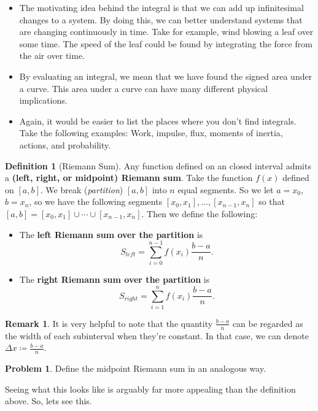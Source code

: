 \documentclass[12pt]{article}
\theoremstyle{definition}
\newtheorem{definition}{Definition}[section]
\newtheorem{remark}{Remark}[section]
\newtheorem{problem}{Problem}[section]
\begin{document}
\begin{itemize}
    \item The motivating idea behind the integral is that we can add up infinitesimal changes to a system. By doing this, we can better understand systems that are changing continuously in time. Take for example, wind blowing a leaf over some time.  The speed of the leaf could be found by integrating the force from the air over time.
    \item By evaluating an integral, we mean that we have found the signed area under a curve.  This area under a curve can have many different physical implications.
    \item Again, it would be easier to list the places where you don't find integrals.  Take the following examples: Work, impulse, flux, moments of inertia, actions, and probability.
\end{itemize}

\begin{definition}[Riemann Sum]
Any function defined on an closed interval admits a \textbf{(left, right, or midpoint) Riemann sum}. Take the function $f(x)$ defined on $[a,b]$. We break (\emph{partition}) $[a,b]$ into $n$ equal segments. So we let $a=x_0$, $b=x_n$, so we have the following segments $[x_0,x_1],\dots,[x_{n-1},x_n]$ so that $[a,b]=[x_0,x_1]\cup \cdots \cup [x_{n-1},x_n]$. Then we define the following:
\begin{itemize}
    \item The \textbf{left Riemann sum over the partition} is
    \[
    S_{left}=\sum_{i=0}^{n-1}f(x_i) \frac{b-a}{n}.
    \]
    \item The \textbf{right Riemann sum over the partition} is
    \[
    S_{right}=\sum_{i=1}^n f(x_i) \frac{b-a}{n}.
    \]
\end{itemize}
\end{definition}

\begin{remark}
It is very helpful to note that the quantity $\frac{b-a}{n}$ can be regarded as the width of each subinterval when they're constant.  In that case, we can denote $\Delta x \coloneqq \frac{b-a}{n}$.
\end{remark}

\begin{problem}
Define the midpoint Riemann sum in an analogous way.
\end{problem}

Seeing what this looks like is arguably far more appealing than the definition above.  So, lets see this. 
\end{document}
